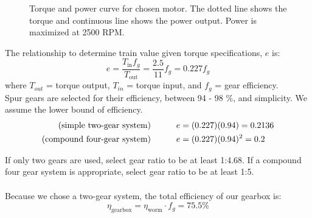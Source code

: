 \documentclass[letterpaper,12pt]{article}
\begin{document}
\begin{figure}[htbp] 
    \centering 
{}
\caption{Torque and power curve for chosen motor. The dotted line shows the torque and continuous line shows the power output. Power is maximized at 2500 RPM.}
\end{figure}
\noindent The relationship to determine train value given torque specifications, $e$ is:
\begin{equation}
e = \frac{T_{\text{in}}f_{g}}{T_{\text{out}}} = \frac{2.5}{11} f_{g} = 0.227f_g
\end{equation}
where $T_{out}$ = torque output, $T_{in}$ = torque input, and $f_g$ = gear efficiency. \\
Spur gears are selected for their efficiency, between 94 - 98 \%, and simplicity. We assume the lower bound of efficiency. 
\begin{eqnarray}
\text{(simple two-gear system)}    \indent\indent &e = (0.227)(0.94) = 0.2136\\
\text{(compound four-gear system)} \indent\indent &e = (0.227)(0.94)^2 = 0.2 
\end{eqnarray}

\noindent If only two gears are used, select gear ratio to be at least 1:4.68. If a compound four gear system is appropriate, select gear ratio to be at least 1:5.
\\\\
Because we chose a two-gear system, the total efficiency of our gearbox is:
$$ \eta_{\text{gearbox}} = \eta_{\text{worm}} \cdot f_g = 75.5\%$$
\end{document}
